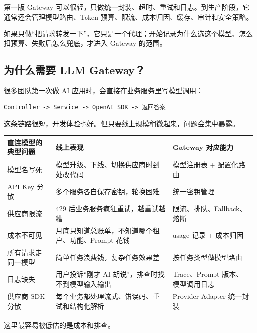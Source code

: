 \documentclass[9pt,a4paper,twocolumn]{ctexart}
\begin{document}
第一版 Gateway 可以很轻，只做统一封装、超时、重试和日志。到生产阶段，它通常还会管理模型路由、Token 预算、限流、成本归因、缓存、审计和安全策略。



如果只做“把请求转发一下”，它只是一个代理；开始记录为什么选这个模型、怎么扣预算、失败后怎么兜底，才进入 Gateway 的范围。



\subsection*{为什么需要 LLM Gateway？}


很多团队第一次做 AI 应用时，会直接在业务服务里写模型调用：



\begin{lstlisting}
Controller -> Service -> OpenAI SDK -> 返回答案
\end{lstlisting}



这条链路很短，开发体验也好。但只要线上规模稍微起来，问题会集中暴露。


{\footnotesize
\begin{tabular}{|p{}|p{}|p{}|}
\hline
\textbf{直连模型的典型问题} & \textbf{线上表现} & \textbf{Gateway 对应能力} \\
\hline
模型名写死 & 模型升级、下线、切换供应商时到处改代码 & 模型注册表 + 配置化路由 \\
\hline
API Key 分散 & 多个服务各自保存密钥，轮换困难 & 统一密钥管理 \\
\hline
供应商限流 & 429 后业务服务疯狂重试，越重试越糟 & 限流、排队、Fallback、熔断 \\
\hline
成本不可见 & 月底只知道总账单，不知道哪个租户、功能、Prompt 花钱 & usage 记录 + 成本归因 \\
\hline
所有请求走同一模型 & 简单任务浪费钱，复杂任务效果差 & 按任务类型做模型路由 \\
\hline
日志缺失 & 用户投诉“刚才 AI 胡说”，排查时找不到模型输入输出 & Trace、Prompt 版本、模型调用日志 \\
\hline
供应商 SDK 分散 & 每个业务都处理流式、错误码、重试和结构化解析 & Provider Adapter 统一封装 \\
\hline
\end{tabular}
}



这里最容易被低估的是成本和排查。
\end{document}
